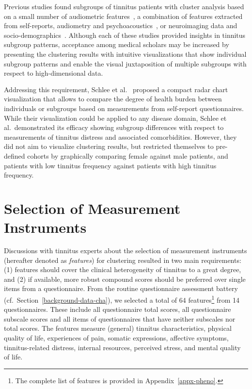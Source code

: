 \documentclass[
  oneside]{book}
\begin{document}
Previous studies found subgroups of tinnitus patients with cluster analysis based on a small number of audiometric features~\autocite{Langguth:LCA2017}, a combination of features extracted from self-reports, audiometry and psychoacoustics~\autocite{Tyler:TinnitusClustering2008}, or neuroimaging data and
socio-demographics~\autocite{Schecklmann:BrainResearch2012}.
Although each of these studies provided insights in tinnitus subgroup patterns, acceptance among medical scholars may be increased by presenting the clustering results with intuitive visualizations that show individual subgroup patterns and enable the visual juxtaposition of multiple subgroups with respect to high-dimensional data.

Addressing this requirement, Schlee et al.~\autocite{Schlee:RadarVis2017} proposed a compact radar chart visualization that allows to compare the degree of health burden between individuals or subgroups based on measurements from self-report questionnaires.
While their visualization could be applied to any disease domain, Schlee et al.~demonstrated its efficacy showing subgroup differences with respect to measurements of tinnitus distress and associated comorbidities.
However, they did not aim to visualize clustering results, but restricted themselves to pre-defined cohorts by graphically comparing female against male patients, and patients with low tinnitus frequency against patients with high tinnitus frequency.

\hypertarget{phenotypes-features}{%
\section{Selection of Measurement Instruments}\label{phenotypes-features}}

Discussions with tinnitus experts about the selection of measurement instruments (hereafter denoted as \emph{features}) for clustering resulted in two main requirements:
(1) features should cover the clinical heterogeneity of tinnitus to a great degree, and
(2) if available, more robust compound scores should be preferred over single items from a questionnaire.
From the routine questionnaire assessment battery (cf.~Section~\ref{background-data-cha}), we selected a total of 64 features\footnote{The complete list of features is provided in Appendix~\ref{appx-pheno}.} from 14 questionnaires.
These include all questionnaire total scores, all questionnaire subscale scores and all items of questionnaires that have neither subscales nor total scores.
The features measure
(general) tinnitus characteristics,
physical quality of life,
experiences of pain,
somatic expressions,
affective symptoms,
tinnitus-related distress,
internal resources,
perceived stress, and
mental quality of life.
\end{document}
